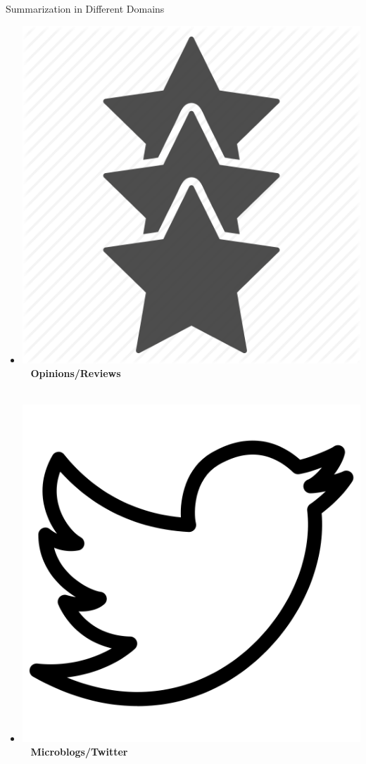 \documentclass[xcolor={table}]{beamer}
\begin{document}
\begin{frame}{Summarization in Different Domains}
\begin{itemize}
    {\scriptsize\citep{gillick2009global}}
~\\~\\
\item[] \includegraphics[scale=.02]{rating_icon}~ \textbf{Opinions/Reviews} 
    {\scriptsize\citep{titov2008joint}}
~\\~\\
\item[] \includegraphics[scale=.02]{tweet_icon}~ \textbf{Microblogs/Twitter} 

\end{itemize}
\end{frame}
\end{document}
